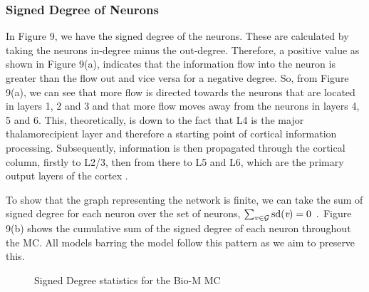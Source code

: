 \subsubsection{Signed Degree of Neurons}
In Figure 9, we have the signed degree of the neurons. These are calculated by taking the neurons in-degree minus the out-degree. Therefore, a positive value as shown in Figure 9(a), indicates that the information flow into the neuron is greater than the flow out and vice versa for a negative degree. So, from Figure 9(a), we can see that more flow is directed towards the neurons that are located in layers 1, 2 and 3 and that more flow moves away from the neurons in layers 4, 5 and 6. This, theoretically, is down to the fact that L4 is the major thalamorecipient layer and therefore a starting point of cortical information processing. Subsequently, information is then propagated through the cortical column, firstly to L2/3, then from there to L5 and L6, which are the primary output layers of the cortex \cite{10.3389/fnana.2017.00091}.

To show that the graph representing the network is finite, we can take the sum of signed degree for each neuron over the set of neurons, $\sum_{v \in \mathcal{G}}\text{sd}(\emph{v}) = 0 \enspace{.}$ Figure 9(b) shows the cumulative sum of the signed degree of each neuron throughout the MC. All models barring the \ER model follow this pattern as we aim to preserve this.

\begin{figure}[H]%
    \centering
    \captionsetup{justification=centering}
    \qquad
    \caption{Signed Degree statistics for the Bio-M MC}%
    \label{fig:example}%
\end{figure}
